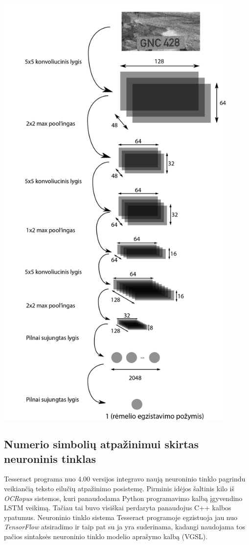 \documentclass{VUMIFInfBakalaurinis}
\begin{document}
\begin{minipage}{\linewidth}
  \includegraphics[width=12cm]{topology.png}
  \label{fig:test}
\end{minipage}

\subsection{Numerio simbolių atpažinimui skirtas neuroninis tinklas}
Tesseract programa nuo 4.00 versijos integravo naują neuroninio tinklo pagrindu veikiančią teksto eilučių atpažinimo posistemę.
Pirminis idėjos šaltinis kilo iš \textit{OCRopus} sistemos, kuri panaudodama Python programavimo kalbą įgyvendino LSTM veikimą.
Tačiau tai buvo visiškai perdaryta panaudojus C++ kalbos ypatumus.
Neuroninio tinklo sistema Tesseract programoje egzistuoja jau nuo \textit{TensorFlow} atsiradimo ir taip pat su ja yra suderinama,
kadangi naudojama tos pačios sintaksės neuroninio tinklo modelio aprašymo kalbą (VGSL).
\end{document}
